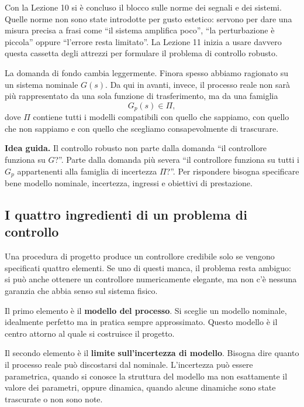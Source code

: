\documentclass[11pt,a4paper]{article}
\begin{document}
Con la Lezione 10 si \`e concluso il blocco sulle norme dei segnali e dei sistemi. Quelle norme non sono state introdotte per gusto estetico: servono per dare una misura precisa a frasi come ``il sistema amplifica poco'', ``la perturbazione \`e piccola'' oppure ``l'errore resta limitato''. La Lezione 11 inizia a usare davvero questa cassetta degli attrezzi per formulare il problema di controllo robusto.

La domanda di fondo cambia leggermente. Finora spesso abbiamo ragionato su un sistema nominale $G(s)$. Da qui in avanti, invece, il processo reale non sar\`a pi\`u rappresentato da una sola funzione di trasferimento, ma da una famiglia
$$
G_p(s)\in\Pi,
$$
dove $\Pi$ contiene tutti i modelli compatibili con quello che sappiamo, con quello che non sappiamo e con quello che scegliamo consapevolmente di trascurare.

\begin{keybox}
\textbf{Idea guida.} Il controllo robusto non parte dalla domanda ``il controllore funziona su $G$?''. Parte dalla domanda pi\`u severa ``il controllore funziona su tutti i $G_p$ appartenenti alla famiglia di incertezza $\Pi$?''. Per rispondere bisogna specificare bene modello nominale, incertezza, ingressi e obiettivi di prestazione.
\end{keybox}

\subsection{I quattro ingredienti di un problema di controllo}

Una procedura di progetto produce un controllore credibile solo se vengono specificati quattro elementi. Se uno di questi manca, il problema resta ambiguo: si pu\`o anche ottenere un controllore numericamente elegante, ma non c'\`e nessuna garanzia che abbia senso sul sistema fisico.

Il primo elemento \`e il \textbf{modello del processo}. Si sceglie un modello nominale, idealmente perfetto ma in pratica sempre approssimato. Questo modello \`e il centro attorno al quale si costruisce il progetto.

Il secondo elemento \`e il \textbf{limite sull'incertezza di modello}. Bisogna dire quanto il processo reale pu\`o discostarsi dal nominale. L'incertezza pu\`o essere parametrica, quando si conosce la struttura del modello ma non esattamente il valore dei parametri, oppure dinamica, quando alcune dinamiche sono state trascurate o non sono note.
\end{document}
